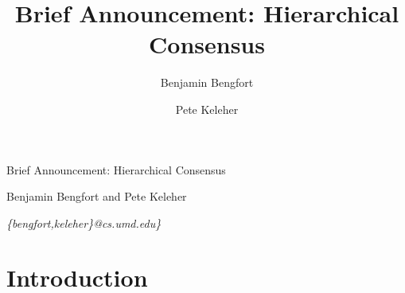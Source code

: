 \documentclass[11pt,letterpaper]{article}
\title{\vspace{-2em}Brief Announcement: Hierarchical Consensus}
\date{}
\author[ ]{Benjamin Bengfort}
\author[ ]{Pete Keleher}
\affil[ ]{\textit{\{bengfort,keleher\}@cs.umd.edu}}
\newcommand{\dspace}{\renewcommand{\baselinestretch}{.95}\Large\normalsize}
\begin{document}
\dspace


\begin{center}
{\LARGE Brief Announcement: Hierarchical Consensus}

\vspace{1em}
{\large Benjamin Bengfort and Pete Keleher}

\vspace{.5em}
{\large\em \{bengfort,keleher\}@cs.umd.edu\}}
\end{center}


\vspace{-1em}
\section{Introduction}
\vspace{-.5em}
\end{document}
